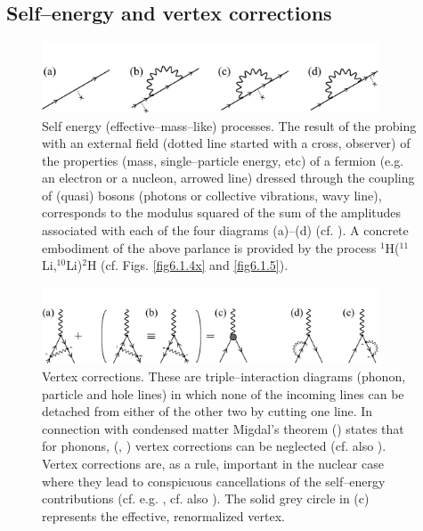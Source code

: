 \begin{subappendices}
\section{Self--energy and vertex corrections}\label{C6AppD}
 \begin{figure}
\centerline{\includegraphics*[width=10cm,angle=0]{C6/figs_C6/fig6_C1}}
\caption{Self energy (effective--mass--like) processes. The result of the probing with an external field (dotted line started with a cross, observer) of the properties (mass, single--particle energy, etc) of a fermion (e.g. an electron or a nucleon, arrowed line) dressed through the coupling of (quasi) bosons (photons or collective vibrations, wavy line), corresponds to the modulus squared of the sum of the amplitudes associated with each of the four diagrams (a)--(d) (cf. \citep{Feynman:75}). A concrete embodiment of the above parlance is provided by the process $^1$H($^{11}$Li,$^{10}$Li)$^2$H (cf. Figs. \ref{fig6.1.4x} and \ref{fig6.1.5}).}\label{fig6_D1}
\end{figure}
 \begin{figure}
\centerline{\includegraphics*[width=10cm,angle=0]{C6/figs_C6/fig6_C2}}
\caption{Vertex corrections. These are triple--interaction  diagrams (phonon, particle and hole lines) in which none of the incoming lines can be detached from either of the other two by cutting one line. In connection with condensed matter Migdal's theorem  (\cite{Migdal:58}) states that for phonons, (\cite{Bardeen:55},  \cite{Frohlich:52}) vertex corrections can be neglected (cf. also \cite{Anderson:64}). Vertex corrections are, as a rule, important in the nuclear case where they lead to conspicuous cancellations of the self--energy contributions (cf. e.g. \cite{Bortignon:83}, cf. also \cite{Anderson:64}). The solid grey circle in (c) represents the effective, renormalized vertex. }\label{fig6_D2}
\end{figure}

\end{subappendices}
